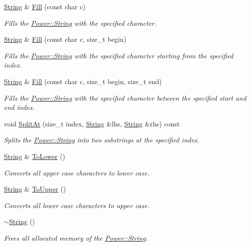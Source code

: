 \begin{DoxyCompactItemize}
\hyperlink{class_power_1_1_string}{String} \& \hyperlink{class_power_1_1_string_a4f2b074b5fc10cad59a929dcfb158fc2}{Fill} (const char c)
\begin{DoxyCompactList}\small\item\em Fills the \hyperlink{class_power_1_1_string}{Power\+::\+String} with the specified character. \end{DoxyCompactList}\item 
\hyperlink{class_power_1_1_string}{String} \& \hyperlink{class_power_1_1_string_ae8e44083b582d9409d9129d5282e19c3}{Fill} (const char c, size\+\_\+t begin)
\begin{DoxyCompactList}\small\item\em Fills the \hyperlink{class_power_1_1_string}{Power\+::\+String} with the specified character starting from the specified index. \end{DoxyCompactList}\item 
\hyperlink{class_power_1_1_string}{String} \& \hyperlink{class_power_1_1_string_af62ccb89f536814db9d86b8c7a1c4eed}{Fill} (const char c, size\+\_\+t begin, size\+\_\+t end)
\begin{DoxyCompactList}\small\item\em Fills the \hyperlink{class_power_1_1_string}{Power\+::\+String} with the specified character between the specified start and end index. \end{DoxyCompactList}\item 
void \hyperlink{class_power_1_1_string_a7009c79c7fa9b393fdbbc1922b14403a}{Split\+At} (size\+\_\+t index, \hyperlink{class_power_1_1_string}{String} \&lhs, \hyperlink{class_power_1_1_string}{String} \&rhs) const
\begin{DoxyCompactList}\small\item\em Splits the \hyperlink{class_power_1_1_string}{Power\+::\+String} into two substrings at the specified index. \end{DoxyCompactList}\item 
\hyperlink{class_power_1_1_string}{String} \& \hyperlink{class_power_1_1_string_aa0e68c88cb84dfa1142a20d2e0d59b3e}{To\+Lower} ()
\begin{DoxyCompactList}\small\item\em Converts all upper case characters to lower case. \end{DoxyCompactList}\item 
\hyperlink{class_power_1_1_string}{String} \& \hyperlink{class_power_1_1_string_a032aabe48ca5b95b9e089998fb8806fa}{To\+Upper} ()
\begin{DoxyCompactList}\small\item\em Converts all lower case characters to upper case. \end{DoxyCompactList}\item 
\hyperlink{class_power_1_1_string_af3e98839735047cdb9362232836fd773}{$\sim$\+String} ()
\begin{DoxyCompactList}\small\item\em Frees all allocated memory of the \hyperlink{class_power_1_1_string}{Power\+::\+String}. \end{DoxyCompactList}\end{DoxyCompactItemize}
